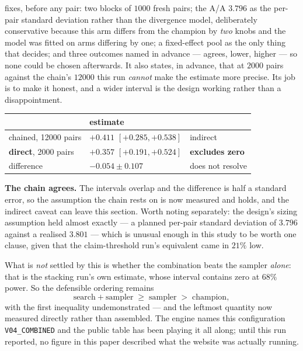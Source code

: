 \documentclass[11pt,a4paper]{article}
\begin{document}
 fixes, before any pair: two blocks
of $1000$ fresh pairs; the A/A $3.796$ as the per-pair standard deviation
rather than the divergence model, deliberately conservative because this arm
differs from the champion by \emph{two} knobs and the model was fitted on arms
differing by one; a fixed-effect pool as the only thing that decides; and three
outcomes named in advance --- agrees, lower, higher --- so none could be chosen
afterwards. It also states, in advance, that at $2000$ pairs against the
chain's $12000$ this run \emph{cannot} make the estimate more precise. Its job
is to make it honest, and a wider interval is the design working rather than a
disappointment.

\begin{center}
\small
\begin{tabular}{lll}
\toprule
& estimate & \\
\midrule
chained, 12000 pairs & $+0.411$ $[+0.285, +0.538]$ & indirect \\
\textbf{direct}, 2000 pairs & $\mathbf{+0.357}$ $[+0.191, +0.524]$ & \textbf{excludes zero} \\
\midrule
difference & $-0.054 \pm 0.107$ & does not resolve \\
\bottomrule
\end{tabular}
\end{center}

\textbf{The chain agrees.} The intervals overlap and the difference is half a
standard error, so the assumption the chain rests on is now measured and holds,
and the indirect caveat can leave this section. Worth noting separately: the
design's sizing assumption held almost exactly --- a planned per-pair standard
deviation of $3.796$ against a realised $3.801$ --- which is unusual enough in
this study to be worth one clause, given that the claim-threshold run's
equivalent came in $21\%$ low.

What is \emph{not} settled by this is whether the combination beats the sampler
\emph{alone}: that is the stacking run's own estimate, whose interval contains
zero at $68\%$ power. So the defensible ordering remains
\[
  \text{search}+\text{sampler} \;\ge\; \text{sampler} \;>\; \text{champion},
\]
with the first inequality undemonstrated --- and the leftmost quantity now
measured directly rather than assembled. The engine names this configuration
\texttt{V04\_COMBINED} and the public table has been playing it all along;
until this run reported, no figure in this paper described what the website was
actually running.
\end{document}
